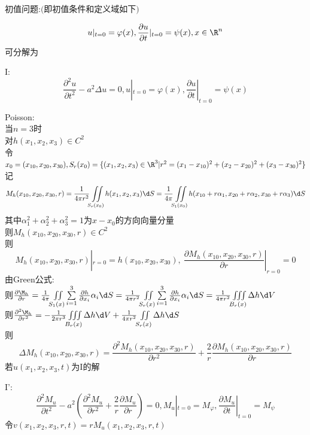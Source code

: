 初值问题:$($即初值条件和定义域如下$)$

\[u|_{t=0}=\varphi(x),\frac{\partial u}{\partial t}|_{t=0}=\psi(x),x\in\R^n\]
可分解为

I:\[\frac{\partial^2 u}{\partial t^2}-a^2\Delta u=0,u|_{t=0}=\varphi(x),\frac{\partial u}{\partial t}|_{t=0}=\psi(x)\]

\begin{jie}
Poisson:\\
当$n=3$时\\
对$h(x_1,x_2,x_3)\in C^2$\\
令$x_0=(x_{10},x_{20},x_{30}),S_{r}(x_{0})=\{(x_1,x_2,x_3)\in\R^3|r^2=(x_1-x_{10})^2+(x_2-x_{20})^2+(x_3-x_{30})^2\}$
记\[M_{h}(x_{10},x_{20},x_{30},r)=\frac{1}{4\pi r^2}\iint\limits_{S_{r}(x_{0})}h(x_1,x_2,x_3)\d S=\frac{1}{4\pi}\iint\limits_{S_{1}(x_{0})}h(x_{10}+r\alpha_1,x_{20}+r\alpha_2,x_{30}+r\alpha_3)\d S\]
其中$\alpha_1^2+\alpha_2^2+\alpha_3^2=1$为$x-x_0$的方向向量分量\\
则$M_{h}(x_{10},x_{20},x_{30},r)\in C^2$\\
则\[M_{h}(x_{10},x_{20},x_{30},r)|_{r=0}=h(x_{10},x_{20},x_{30}),\ \frac{\partial M_{h}(x_{10},x_{20},x_{30},r)}{\partial r}|_{r=0}=0\]
由Green公式:\\
则$\frac{\partial \M_{h}}{\partial r}=\frac{1}{4\pi}\iint\limits_{S_1(x)}\sum\limits_{i=1}^{3}\frac{\partial h}{\partial x_i}\alpha_i\d S=\frac{1}{4\pi r^2}\iint\limits_{S_r(x)}\sum\limits_{i=1}^{3}\frac{\partial h}{\partial x_i}\alpha_i\d S=\frac{1}{4\pi r^2}\iiint\limits_{B_{r}(x)}\Delta h\d V$\\
则$\frac{\partial^2 \M_{h}}{\partial r^2}=-\frac{1}{2\pi r^3}\iiint\limits_{B_{r}(x)}\Delta h\d V+\frac{1}{4\pi r^2}\iint\limits_{S_{r}(x)}\Delta h\d S$\\
则\[\Delta M_{h}(x_{10},x_{20},x_{30},r)=\frac{\partial^2 M_{h}(x_{10},x_{20},x_{30},r)}{\partial r^2}+\frac{2}{r}\frac{\partial M_{h}(x_{10},x_{20},x_{30},r)}{\partial r}\]
若$u(x_1,x_2,x_3,t)$为\rm{I}的解

\rm{I}':
\[\frac{\partial^2 M_{u}}{\partial t^2}-a^2(\frac{\partial^2 M_{u}}{\partial r^2}+\frac{2}{r}\frac{\partial M_{u}}{\partial r})=0,M_{u}|_{t=0}=M_{\varphi},\frac{\partial M_{u}}{\partial t}|_{t=0}=M_{\psi}\]
令$v(x_1,x_2,x_3,r,t)=rM_{u}(x_1,x_2,x_3,r,t)$


\end{jie}
